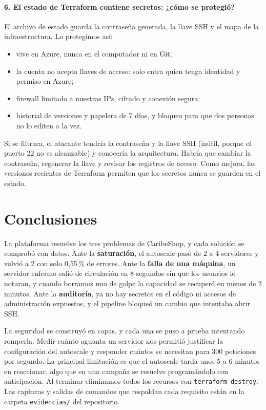 \documentclass[11pt,letterpaper]{article}
\begin{document}
\paragraph{6. El estado de Terraform contiene secretos: ¿cómo se protegió?}
El archivo de estado guarda la contraseña generada, la llave SSH y el mapa de la infraestructura.
Lo protegimos así:
\begin{itemize}
  \item vive en Azure, nunca en el computador ni en Git;
  \item la cuenta no acepta llaves de acceso: solo entra quien tenga identidad y permiso en Azure;
  \item firewall limitado a nuestras IPs, cifrado y conexión segura;
  \item historial de versiones y papelera de 7 días, y bloqueo para que dos personas no lo editen
        a la vez.
\end{itemize}
Si se filtrara, el atacante tendría la contraseña y la llave SSH (inútil, porque el puerto 22 no es
alcanzable) y conocería la arquitectura. Habría que cambiar la contraseña, regenerar la llave y
revisar los registros de acceso. Como mejora, las versiones recientes de Terraform permiten que
los secretos nunca se guarden en el estado.

\section{Conclusiones}
La plataforma resuelve los tres problemas de CaribeShop, y cada solución se comprobó con datos.
Ante la \textbf{saturación}, el autoscale pasó de 2 a 4 servidores y volvió a 2 con solo 0,55\,\%
de errores. Ante la \textbf{falla de una máquina}, un servidor enfermo salió de circulación en
8 segundos sin que los usuarios lo notaran, y cuando borramos uno de golpe la capacidad se
recuperó en menos de 2 minutos. Ante la \textbf{auditoría}, ya no hay secretos en el código ni
accesos de administración expuestos, y el pipeline bloqueó un cambio que intentaba abrir SSH.

La seguridad se construyó en capas, y cada una se puso a prueba intentando romperla. Medir cuánto
aguanta un servidor nos permitió justificar la configuración del autoscale y responder cuántos se
necesitan para 300 peticiones por segundo. La principal limitación es que el autoscale tarda unos
5 a 6 minutos en reaccionar, algo que en una campaña se resuelve programándolo con anticipación.
Al terminar eliminamos todos los recursos con \texttt{terraform destroy}. Las capturas y salidas
de comandos que respaldan cada requisito están en la carpeta \texttt{evidencias/} del repositorio.
\end{document}

